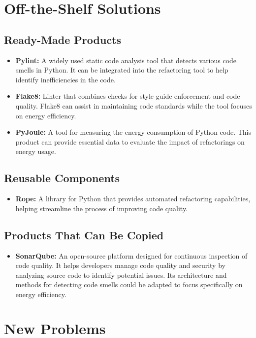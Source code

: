 \documentclass[12pt]{article}
\begin{document}
\section{Off-the-Shelf Solutions}
\subsection{Ready-Made Products}

\begin{itemize}
  \item \textbf{Pylint:} A widely used static code analysis tool that
    detects various code smells in Python. It can be integrated into
    the refactoring tool to help identify inefficiencies in the code.
  \item \textbf{Flake8:} Linter that combines checks for style guide
    enforcement and code quality. Flake8 can assist in maintaining
    code standards while the tool focuses on energy efficiency.
  \item \textbf{PyJoule:} A tool for measuring the energy consumption
    of Python code. This product can provide essential data to
    evaluate the impact of refactorings on energy usage.
\end{itemize}

\subsection{Reusable Components}
\begin{itemize}
  \item \textbf{Rope:} A library for Python that provides automated
    refactoring capabilities, helping streamline the process of
    improving code quality.
\end{itemize}
\subsection{Products That Can Be Copied}
\begin{itemize}
  \item \textbf{SonarQube:} An open-source platform designed for
    continuous inspection of code quality. It helps developers manage
    code quality and security by analyzing source code to identify
    potential issues. Its architecture and methods for detecting code
    smells could be adapted to focus specifically on energy efficiency.
\end{itemize}

\section{New Problems}
\end{document}
